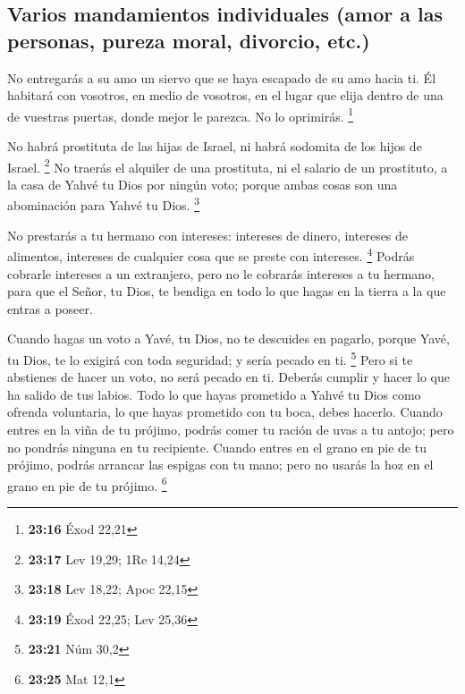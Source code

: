 \begin{paracol}{2}
\hypertarget{varios-mandamientos-individuales-amor-a-las-personas-pureza-moral-divorcio-etc.}{%
\subsection{Varios mandamientos individuales (amor a las personas,
pureza moral, divorcio,
etc.)}\label{varios-mandamientos-individuales-amor-a-las-personas-pureza-moral-divorcio-etc.}}

 No entregarás a su amo un siervo que se haya escapado de
su amo hacia ti.  Él habitará con vosotros, en medio de
vosotros, en el lugar que elija dentro de una de vuestras puertas, donde
mejor le parezca. No lo oprimirás. \footnote{\textbf{23:16} Éxod 22,21}

 No habrá prostituta de las hijas de Israel, ni habrá
sodomita de los hijos de Israel. \footnote{\textbf{23:17} Lev 19,29; 1Re
  14,24}  No traerás el alquiler de una prostituta, ni el
salario de un prostituto, a la casa de Yahvé tu Dios por ningún voto;
porque ambas cosas son una abominación para Yahvé tu Dios. \footnote{\textbf{23:18}
  Lev 18,22; Apoc 22,15}

 No prestarás a tu hermano con intereses: intereses de
dinero, intereses de alimentos, intereses de cualquier cosa que se
preste con intereses. \footnote{\textbf{23:19} Éxod 22,25; Lev 25,36}
 Podrás cobrarle intereses a un extranjero, pero no le
cobrarás intereses a tu hermano, para que el Señor, tu Dios, te bendiga
en todo lo que hagas en la tierra a la que entras a poseer.

 Cuando hagas un voto a Yavé, tu Dios, no te descuides en
pagarlo, porque Yavé, tu Dios, te lo exigirá con toda seguridad; y sería
pecado en ti. \footnote{\textbf{23:21} Núm 30,2}  Pero si
te abstienes de hacer un voto, no será pecado en ti. 
Deberás cumplir y hacer lo que ha salido de tus labios. Todo lo que
hayas prometido a Yahvé tu Dios como ofrenda voluntaria, lo que hayas
prometido con tu boca, debes hacerlo.  Cuando entres en
la viña de tu prójimo, podrás comer tu ración de uvas a tu antojo; pero
no pondrás ninguna en tu recipiente.  Cuando entres en el
grano en pie de tu prójimo, podrás arrancar las espigas con tu mano;
pero no usarás la hoz en el grano en pie de tu prójimo. \footnote{\textbf{23:25}
  Mat 12,1}

\switchcolumn
\begin{otherlanguage}{english}


\end{otherlanguage}
\end{paracol}
